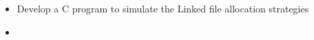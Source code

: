 \documentclass{article}
\newcommand{\question}[2]{
	\item [#1.] #2
}
\newcommand{\answer}[1]{\item [$\rightarrow$] \inputminted{c}{#1}}
\begin{document}
	\begin{itemize}
		\question{9}{
			Develop a C program to simulate the Linked file allocation strategies
		}

		\answer{lab9.c}
	\end{itemize}
\end{document}
